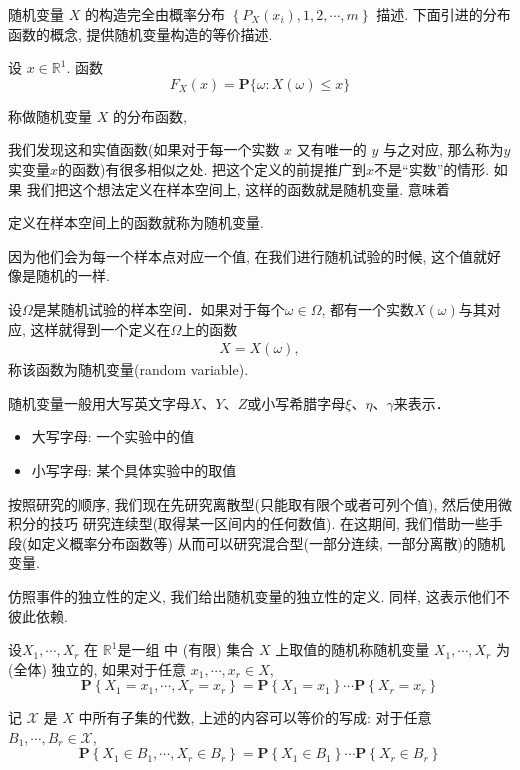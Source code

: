 随机变量 $X$ 的构造完全由概率分布 $\left\{P_{X}\left(x_i\right), 1,2, \cdots, m\right\}$ 描述. 下面引进的分布函数的概念, 提供随机变量构造的等价描述.

\begin{definition*}
    设 $x \in \mathbb{R}^1$. 函数
$$
F_{X}(x)=\mathbf{P}\{\omega: X(\omega) \leqslant x\}
$$

称做随机变量 $X$ 的分布函数,
\end{definition*}

我们发现这和实值函数(如果对于每一个实数 $x$ 又有唯一的 $y$ 与之对应,
那么称为$y$ 实变量$x$的函数)有很多相似之处. 把这个定义的前提推广到$x$不是``实数''的情形. 如果
我们把这个想法定义在样本空间上, 这样的函数就是随机变量. 意味着

\begin{definition*}
    定义在样本空间上的函数就称为随机变量.
\end{definition*}

因为他们会为每一个样本点对应一个值, 在我们进行随机试验的时候, 这个值就好像是随机的一样.

\begin{definition}[随机变量]
    设$\Omega$是某随机试验的样本空间．如果对于每个$\omega\in\Omega$, 都有一个实数$X(\omega)$与其对应, 这样就得到一个定义在$\Omega$上的函数
    \begin{align*}
        X=X(\omega),
    \end{align*}
    称该函数为随机变量(random variable).
\end{definition}

随机变量一般用大写英文字母$X$、$Y$、$Z$或小写希腊字母$\xi$、$\eta$、$\gamma$来表示．
\begin{itemize}
    \item 大写字母: 一个实验中的值
    \item 小写字母: 某个具体实验中的取值
\end{itemize}

按照研究的顺序, 我们现在先研究离散型(只能取有限个或者可列个值), 然后使用微积分的技巧
研究连续型(取得某一区间内的任何数值). 在这期间, 我们借助一些手段(如定义概率分布函数等)
从而可以研究混合型(一部分连续, 一部分离散)的随机变量.




仿照事件的独立性的定义, 我们给出随机变量的独立性的定义. 同样, 这表示他们不彼此依赖. 

\begin{definition}
    设$X_1, \cdots, X_r$ 在 $\mathbb{R}^1$是一组  中 (有限) 集合 $X$ 上取值的随机称随机变量 $X_1, \cdots, X_r$ 为 (全体) 独立的, 如果对于任意 $x_1, \cdots, x_r \in X$,
$$
\mathbf{P}\left\{X_1=x_1, \cdots, X_r=x_r\right\}=\mathbf{P}\left\{X_1=x_1\right\} \cdots \mathbf{P}\left\{X_r=x_r\right\}
$$
\end{definition}

\begin{shaded}
    记 $\mathscr{X}$ 是 $X$ 中所有子集的代数, 上述的内容可以等价的写成: 对于任意 $B_1, \cdots, B_r \in \mathscr{X}$,
    $$
    \mathbf{P}\left\{X_1 \in B_1, \cdots, X_r \in B_r\right\}=\mathbf{P}\left\{X_1 \in B_1\right\} \cdots \mathbf{P}\left\{X_r \in B_r\right\}
    $$
\end{shaded}